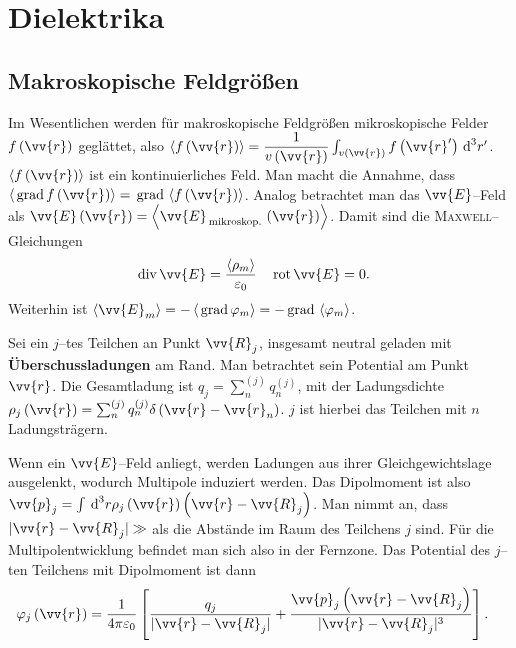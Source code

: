 \documentclass[a4paper,12pt]{article}
\newcommand{\td}{\,\text{d}}
\numberwithin{equation}{section}
\begin{document}
\newpage
\section{Dielektrika}
\subsection{Makroskopische Feldgrößen}
Im Wesentlichen werden für makroskopische Feldgrößen mikroskopische Felder $f\left(\vv{r}\right)$ geglättet, also $\left\langle f\left(\vv{r}\right)\right\rangle =\dfrac{1}{v\left(\vv{r}\right)}\int_{v\left(\vv{r}\right)}^{}f\left(\vv{r}'\right)\td ^3r'$. $\left\langle f\left(\vv{r}\right)\right\rangle $ ist ein kontinuierliches Feld. Man macht die Annahme, dass $\left\langle \,\text{grad}\,f\left(\vv{r}\right)\right\rangle =\,\text{grad}\,\left\langle f\left(\vv{r}\right)\right\rangle $. Analog betrachtet man das $\vv{E}$--Feld als $\vv{E}\left(\vv{r}\right)=\left\langle \vv{E}_{\,\text{mikroskop.}\,}\left(\vv{r}\right)\right\rangle $. Damit sind die \textsc{Maxwell}--Gleichungen
\begin{align} 
        \,\text{div}\,\vv{E}&=\dfrac{\left\langle \rho _m\right\rangle }{\varepsilon _0}&\,\text{rot}\,\vv{E}&=0
.\end{align} 
Weiterhin ist $\left\langle \vv{E}_m\right\rangle =-\left\langle \,\text{grad}\,\varphi _m\right\rangle =-\,\text{grad}\,\left\langle \varphi _m\right\rangle $.\par
Sei ein $j$--tes Teilchen an Punkt $\vv{R}_j$, insgesamt neutral geladen mit \textbf{Überschussladungen} am Rand. 
Man betrachtet sein Potential am Punkt $\vv{r}$.
Die Gesamtladung ist $q_j=\sum_{n}^{\left(j\right)}q ^{(j)}_n $, mit der Ladungsdichte $\rho _j\left(\vv{r}\right)=\sum_{n}^{(j)}q ^{(j)}_n\delta \left(\vv{r}-\vv{r}_n\right)$.
$j$ ist hierbei das Teilchen mit $n$ Ladungsträgern.\par
Wenn ein $\vv{E}$--Feld anliegt, werden Ladungen aus ihrer Gleichgewichtslage ausgelenkt, wodurch Multipole induziert werden.
Das Dipolmoment ist also $\vv{p}_j=\int_{}^{}\td ^3r\rho _j\left(\vv{r}\right)\left(\vv{r}-\vv{R}_j\right)$.
Man nimmt an, dass $|\vv{r}-\vv{R}_j|\gg$ als die Abstände im Raum des Teilchens $j$ sind.
Für die Multipolentwicklung befindet man sich also in der Fernzone.
Das Potential des $j$--ten Teilchens mit Dipolmoment ist dann
\begin{align} 
        \varphi _j\left(\vv{r}\right)&=\dfrac{1}{4\pi \varepsilon _0}\left[\dfrac{q_j}{|\vv{r}-\vv{R}_j|}+\dfrac{\vv{p}_j\left(\vv{r}-\vv{R}_j\right)}{|\vv{r}-\vv{R}_j|^3}\right]
.\end{align} 
\end{document}
